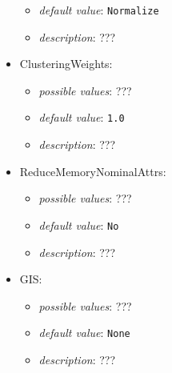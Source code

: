 \documentclass{article}
\begin{document}
\begin{itemize}
\begin{itemize}
                \item \emph{default value}: \texttt{Normalize}
                \item \emph{description}: ???
           \end{itemize}
    \item ClusteringWeights:
           \begin{itemize}
                \item \emph{possible values}: ???
                \item \emph{default value}: \texttt{1.0}
                \item \emph{description}: ???
           \end{itemize}
    \item ReduceMemoryNominalAttrs:
           \begin{itemize}
                \item \emph{possible values}: ???
                \item \emph{default value}: \texttt{No}
                \item \emph{description}: ???
           \end{itemize}
    \item GIS:
           \begin{itemize}
                \item \emph{possible values}: ???
                \item \emph{default value}: \texttt{None}
                \item \emph{description}: ???
           \end{itemize}
\end{itemize}
\end{document}

